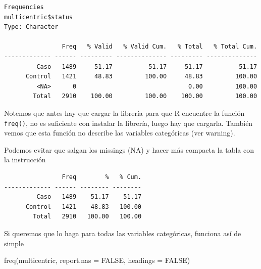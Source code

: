 \documentclass[
]{book}
\newenvironment{Shaded}{\begin{snugshade}}{\end{snugshade}}
\newcommand{\AttributeTok}[1]{\textcolor[rgb]{0.77,0.63,0.00}{#1}}
\newcommand{\ConstantTok}[1]{\textcolor[rgb]{0.00,0.00,0.00}{#1}}
\newcommand{\FunctionTok}[1]{\textcolor[rgb]{0.00,0.00,0.00}{#1}}
\newcommand{\NormalTok}[1]{#1}
\newcommand{\SpecialCharTok}[1]{\textcolor[rgb]{0.00,0.00,0.00}{#1}}
\begin{document}
\begin{Shaded}
\end{Shaded}

\begin{verbatim}
Frequencies  
multicentric$status  
Type: Character  

                Freq   % Valid   % Valid Cum.   % Total   % Total Cum.
------------- ------ --------- -------------- --------- --------------
         Caso   1489     51.17          51.17     51.17          51.17
      Control   1421     48.83         100.00     48.83         100.00
         <NA>      0                               0.00         100.00
        Total   2910    100.00         100.00    100.00         100.00
\end{verbatim}

Notemos que antes hay que cargar la librería para que R encuentre la función \texttt{freq()}, no es suficiente con instalar la librería, luego hay que cargarla. También vemos que esta función no describe las variables categóricas (ver warning).

Podemos evitar que salgan los missings (NA) y hacer más compacta la tabla con la instrucción

\begin{Shaded}
\end{Shaded}

\begin{verbatim}
                Freq        %   % Cum.
------------- ------ -------- --------
         Caso   1489    51.17    51.17
      Control   1421    48.83   100.00
        Total   2910   100.00   100.00
\end{verbatim}

Si queremos que lo haga para todas las variables categóricas, funciona así de simple

\begin{Shaded}
\begin{Highlighting}[]
\FunctionTok{freq}\NormalTok{(multicentric, }\AttributeTok{report.nas =} \ConstantTok{FALSE}\NormalTok{, }\AttributeTok{headings =} \ConstantTok{FALSE}\NormalTok{)}
\end{Highlighting}
\end{Shaded}
\end{document}
